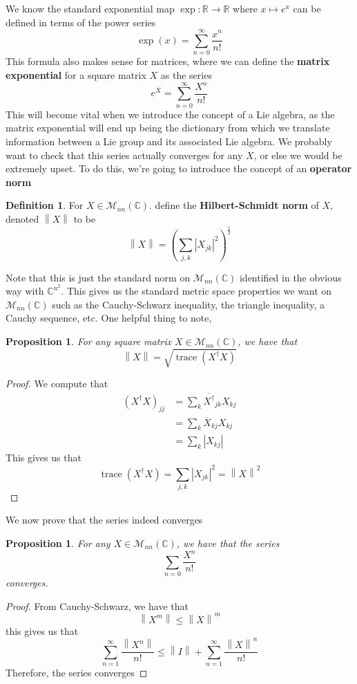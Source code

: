 \documentclass[psamsfonts]{amsart}
\newtheorem{prop}[thm]{Proposition}
\theoremstyle{definition}
\newtheorem{defn}[thm]{Definition}
\theoremstyle{remark}
\newcommand{\R}{\mathbb{R}}
\newcommand{\C}{\mathbb{C}}
\newcommand{\norm}[1]{\left\lVert#1\right\rVert}
\DeclareMathOperator{\trace}{trace}
\begin{document}
We know the standard exponential map $\exp: \R \to \R$ where $x \mapsto e^x$ can be defined in terms of the power series
$$\exp(x) = \sum\limits_{n = 0}^\infty \frac{x^n}{n!} $$
This formula also makes sense for matrices, where we can define the \textbf{matrix exponential} for a square matrix $X$ as the series
$$e^X = \sum\limits_{n = 0}^\infty \frac{X^n}{n!} $$
This will become vital when we introduce the concept of a Lie algebra, as the matrix exponential will end up being the dictionary from which we translate information between a Lie group and its associated Lie algebra. We probably want to check that this series actually converges for any $X$, or else we would be extremely upset. To do this, we're going to introduce the concept of an \textbf{operator norm}
\begin{defn}
For $X \in \mathcal{M}_{nn}(\C)$. define the \textbf{Hilbert-Schmidt norm} of $X$, denoted $\norm{X}$ to be 
$$\norm{X} = \left( \sum\limits_{j,k} |X_{jk}|^2 \right)^{\frac{1}{2}} $$
\end{defn}
Note that this is just the standard norm on $\mathcal{M}_{nn}(\C)$ identified in the obvious way with $\C^{n^2}$. This gives us the standard metric space properties we want on $\mathcal{M}_{nn}(\C)$ such as the Cauchy-Schwarz inequality, the triangle inequality, a Cauchy sequence, etc. One helpful thing to note,
\begin{prop}
For any square matrix $X \in \mathcal{M}_{nn}(\C)$, we have that 
$$\norm{X} =  \sqrt{\trace (X^\dagger X)}$$
\end{prop}

\begin{proof}
We compute that 
\begin{align*}
(X^\dagger X)_{jj} &= \sum_{k} \overline{X^\dagger}_{jk} X_{k j} \\
&= \sum_{k} \overline{X}_{kj} X_{kj} \\
&= \sum_{k}|X_{kj}|
\end{align*}
This gives us that 
$$\trace (X^\dagger X) = \sum_{j,k}|X_{jk}|^2 = \norm{X}^2 $$
\end{proof}

We now prove that the series indeed converges
\begin{prop}
For any $X \in \mathcal{M}_{nn}(\C)$, we have that the series
$$\sum_{n = 0} \frac{X^n}{n!}$$
converges.
\end{prop}

\begin{proof}
From Cauchy-Schwarz, we have that 
$$\norm{X^m} \leq \norm{X}^m $$
this gives us that 
$$\sum_{n = 1}^\infty \frac{\norm{X^n}}{n!} \leq \norm{I} + \sum_{n=1}^\infty \frac{\norm{X}^n}{n!} $$
Therefore, the series converges
\end{proof}
\end{document}
